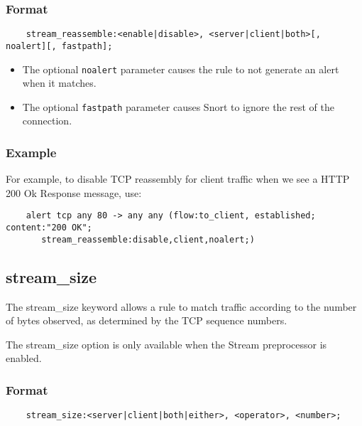 \documentclass[english]{report}
\newenvironment{note}{
\samepage
    \vspace{10pt}{\textsf{
        {\hspace{7pt}\Huge{$\triangle$\hspace{-12.5pt}{\Large{$^!$}}}}\hspace{5pt}
        {\Large{NOTE}}
    }
    }
   \begin{center}
    \par\vspace{-17pt}

    \begin{lrbox}{\savepar}
    \begin{minipage}[r]{6in}
}
{
    \end{minipage}
    \end{lrbox}
    \fbox{
        \usebox{
            \savepar
	}
    }
    \par\vskip10pt
    \end{center}
}
\newenvironment{note}{
        \begin{rawhtml}
        <p><table border="1"><tr><td><b>
        Note:&nbsp;&nbsp;</b>
        \end{rawhtml}
}{
        \begin{rawhtml}
        </b></td></tr></table></p>
        \end{rawhtml}
}
\begin{document}
\subsubsection{Format}

\begin{verbatim}
    stream_reassemble:<enable|disable>, <server|client|both>[, noalert][, fastpath];
\end{verbatim}

\begin{itemize}
\item The optional \texttt{noalert} parameter causes the rule to not generate
an alert when it matches.
\item The optional \texttt{fastpath} parameter causes Snort to ignore the rest of the
connection.
\end{itemize}

\subsubsection{Example}

For example, to disable TCP reassembly for client traffic when we see a
HTTP 200 Ok Response message, use:

\begin{verbatim}
    alert tcp any 80 -> any any (flow:to_client, established; content:"200 OK";
       stream_reassemble:disable,client,noalert;)
\end{verbatim}

\subsection{stream\_size}

The stream\_size keyword allows a rule to match traffic according to the number
of bytes observed, as determined by the TCP sequence numbers.  

\begin{note}

The stream\_size option is only available when the Stream preprocessor is
enabled.

\end{note}

\subsubsection{Format}

\begin{verbatim}
    stream_size:<server|client|both|either>, <operator>, <number>;
\end{verbatim}
\end{document}

